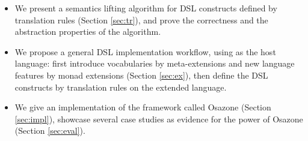 \begin{itemize}
  \item We present a semantics lifting algorithm for DSL constructs defined by translation rules (Section \ref{sec:tr}), and prove the correctness and the abstraction properties of the algorithm.
  \item We propose a general DSL implementation workflow, using \STLC{} as the host language:
    first introduce vocabularies by meta-extensions and new language features by monad extensions (Section \ref{sec:ex}),
    then define the DSL constructs by translation rules on the extended language.
  \item We give an implementation of the framework called Osazone (Section \ref{sec:impl}), showcase several case studies as evidence for the power of Osazone (Section \ref{sec:eval}).
\end{itemize}

